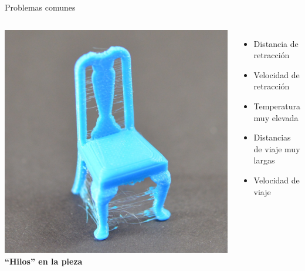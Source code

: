 \documentclass{beamer}
\begin{document}
	\begin{frame}{Problemas comunes}
		\begin{columns}
				\includegraphics[width=\textwidth]{images/Hairs-And-Stringing}
				\textbf{``Hilos'' en la pieza}
				\begin{itemize}
					\item Distancia de retracción
					\item Velocidad de retracción
					\item Temperatura muy elevada
					\item Distancias de viaje muy largas
					\item Velocidad de viaje
				\end{itemize}
		\end{columns}
	\end{frame}
\end{document}
